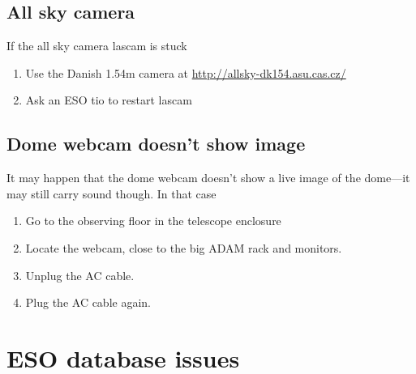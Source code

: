 \documentclass[11pt,fleqn,a4paper]{book}
\begin{document}
\subsection{All sky camera}
If the all sky camera \gls{lascam} is stuck
\begin{enumerate}
  \item Use the Danish 1.54m camera at \url{http://allsky-dk154.asu.cas.cz/}
  \item Ask an ESO \gls{tio} to restart \gls{lascam}
\end{enumerate}

\subsection{Dome webcam doesn't show image}
It may happen that the dome \gls{webcam} doesn't show a live image of the dome---it may still carry sound though. In that case
\begin{enumerate}
   \item Go to the observing floor in the telescope enclosure
   \item Locate the webcam, close to the big ADAM rack and monitors.
   \item Unplug the AC cable.
   \item Plug the AC cable again.
\end{enumerate}

\section{ESO database issues}
\end{document}
